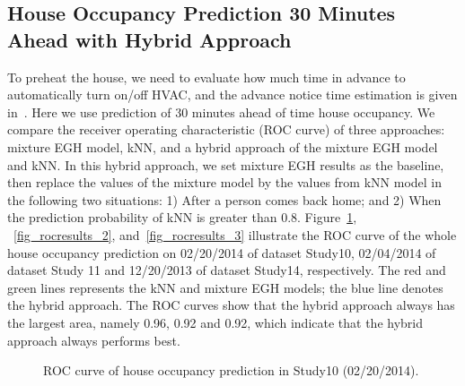 \subsection{House Occupancy Prediction 30 Minutes Ahead with Hybrid Approach}
To preheat the house, we need to evaluate how much time in advance to automatically turn on/off HVAC, and the advance notice time estimation is given in~\cite{scott2011preheat}. 
Here we use prediction of 30 minutes ahead of time house occupancy. 
We compare the receiver operating characteristic (ROC curve) of three approaches: mixture EGH model,  kNN, and a hybrid approach of the mixture EGH model and kNN. 
In this hybrid approach, 
we set mixture EGH results as the baseline, 
then replace the values of the mixture model by the values from kNN model 
in the following two situations: 
1) After a person comes back home; and 2) When the prediction probability of kNN is greater than 0.8. 
Figure~\ref{fig_rocresults_1}, ~\ref{fig_rocresults_2}, and~\ref{fig_rocresults_3} illustrate the ROC curve of the whole house occupancy prediction on 02/20/2014 of dataset Study10, 02/04/2014 of dataset Study 11 
and 12/20/2013 of dataset Study14, respectively.  
The red and green lines represents the kNN and mixture EGH models; 
the blue line denotes the hybrid approach. 
The ROC curves show that the hybrid approach always has the largest area, namely 
0.96, 0.92 and 0.92, 
which indicate that the hybrid approach always performs best. 
%
\begin{figure}[h]
	\caption{
	ROC curve of house occupancy prediction in Study10 (02/20/2014).}
	\label{fig_rocresults_1}
\end{figure}

